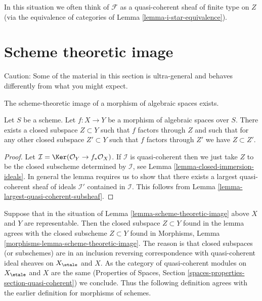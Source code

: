 \noindent
In this situation we often think of $\mathcal{F}$ as a quasi-coherent
sheaf of finite type on $Z$ (via the equivalence of categories of
Lemma \ref{lemma-i-star-equivalence}).






\section{Scheme theoretic image}
\label{section-scheme-theoretic-image}

\noindent
Caution: Some of the material in this section is ultra-general and
behaves differently from what you might expect.

\begin{lemma}
\label{lemma-scheme-theoretic-image}
\begin{slogan}
The scheme-theoretic image of a morphism of algebraic spaces exists.
\end{slogan}
Let $S$ be a scheme. Let $f : X \to Y$ be a morphism of algebraic spaces
over $S$. There exists a closed subspace $Z \subset Y$ such that $f$ factors
through $Z$ and such that for any other closed subspace $Z' \subset Y$
such that $f$ factors through $Z'$ we have $Z \subset Z'$.
\end{lemma}

\begin{proof}
Let $\mathcal{I} = \Ker(\mathcal{O}_Y \to f_*\mathcal{O}_X)$.
If $\mathcal{I}$ is quasi-coherent then we just take $Z$ to be the
closed subscheme determined by $\mathcal{I}$, see
Lemma \ref{lemma-closed-immersion-ideals}.
In general the lemma requires us to show that there exists
a largest quasi-coherent sheaf of ideals $\mathcal{I}'$ contained in
$\mathcal{I}$.
This follows from Lemma \ref{lemma-largest-quasi-coherent-subsheaf}.
\end{proof}

\noindent
Suppose that in the situation of Lemma \ref{lemma-scheme-theoretic-image}
above $X$ and $Y$ are representable. Then the closed subspace $Z \subset Y$
found in the lemma agrees with the closed subscheme $Z \subset Y$ found in
Morphisms, Lemma \ref{morphisms-lemma-scheme-theoretic-image}.
The reason is that closed subspaces (or subschemes) are in an inclusion
reversing correspondence with quasi-coherent ideal sheaves on
$X_\etale$ and $X$. As the category of quasi-coherent modules
on $X_\etale$ and $X$ are the same
(Properties of Spaces, Section \ref{spaces-properties-section-quasi-coherent})
we conclude. Thus the following definition agrees with the earlier
definition for morphisms of schemes.


